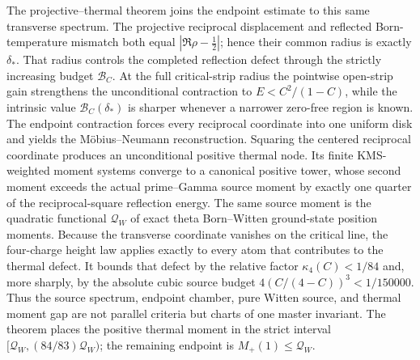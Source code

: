 \documentclass[11pt]{article}
\begin{document}
The projective--thermal theorem joins the endpoint estimate to this same transverse spectrum.
The projective reciprocal displacement and reflected Born-temperature mismatch both equal
$|\Re\rho-\frac12|$; hence their common radius is exactly $\delta_*$.  That radius controls the
completed reflection defect through the strictly increasing budget $\mathcal B_C$.  At the full
critical-strip radius the pointwise open-strip gain strengthens the unconditional contraction to
$E<C^2/(1-C)$, while the intrinsic value $\mathcal B_C(\delta_*)$ is sharper whenever a narrower
zero-free region is known.
The endpoint contraction forces every reciprocal coordinate into one uniform disk and yields the
M\"obius--Neumann reconstruction.  Squaring the centered reciprocal coordinate produces an
unconditional positive thermal node.  Its finite KMS-weighted moment systems converge to a
canonical positive tower, whose second moment exceeds the actual prime--Gamma source moment by
exactly one quarter of the reciprocal-square reflection energy.  The same source moment is the
quadratic functional $\mathcal Q_W$ of exact theta Born--Witten ground-state position moments.
Because the transverse coordinate vanishes on the critical line, the four-charge height law
applies exactly to every atom that contributes to the thermal defect.  It bounds that defect by
the relative factor $\kappa_4(C)<1/84$ and, more sharply, by the absolute cubic source budget
$4(C/(4-C))^3<1/150000$.  Thus the source spectrum,
endpoint chamber, pure Witten source, and thermal moment gap are not parallel criteria but charts
of one master invariant.  The theorem places the positive thermal moment in the strict interval
$[\mathcal Q_W,(84/83)\mathcal Q_W)$; the remaining endpoint is
$M_+(1)\le\mathcal Q_W$.
\end{document}
